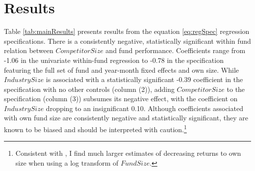 \documentclass[openany]{book}
\let\rmarkdownfootnote\footnote%
\def\footnote{\protect\rmarkdownfootnote}
\theoremstyle{definition}
\theoremstyle{definition}
\theoremstyle{definition}
\theoremstyle{remark}
\begin{document}
\section{Results}\label{results-1}

Table \ref{tab:mainResults} presents results from the equation
\eqref{eq:regSpec} regression specifications. There is a consistently
negative, statistically significant within fund relation between
\(CompetitorSize\) and fund performance. Coefficients range from -1.06
in the univariate within-fund regression to -0.78 in the specification
featuring the full set of fund and year-month fixed effects and own
size. While \(IndustrySize\) is associated with a statistically
significant -0.39 coefficient in the specification with no other
controls (column (2)), adding \(CompetitorSize\) to the specification
(column (3)) subsumes its negative effect, with the coefficient on
\(IndustrySize\) dropping to an insignificant 0.10. Although
coefficients associated with own fund size are consistently negative and
statistically significant, they are known to be biased and should be
interpreted with caution.\footnote{Consistent with \citet{hl17}, I find
  much larger estimates of decreasing returns to own size when using a
  log transform of \(FundSize\).}
\end{document}
